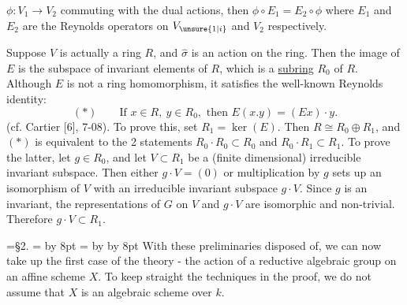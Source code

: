 
$\phi:V_1\longrightarrow V_2$ commuting with the dual actions, then $\phi\circ E_1=E_2\circ\phi$ where $E_1$ and $E_2$ are the Reynolds operators on $V_{\unsure{1|i}}$ and $V_2$ respectively.

Suppose $V$ is actually a ring $R$, and $\hat\sigma$ is an action on the ring. Then the image of $E$ is the subspace of invariant elements of $R$, which is a \uline{subring} $R_0$ of $R$. Although $E$ is not a ring homomorphism, it satisfies the well-known Reynolds identity:
\[
(*)\qquad\text{If }x\in R,\ y\in R_0,\text{ then }E(x.y)=(Ex)\cdot y.
\]
(cf. Cartier\unsure{,} [6], 7-08). To prove this, set $R_1=\ker(E)$. Then $R\cong R_0\oplus R_1$, and $(*)$ is equivalent to the 2 statements $R_0\cdot R_0\subset R_0$ and $R_0\cdot R_1\subset R_1$. To prove the latter, let $g\in R_0$, and let $V\subset R_1$ be a (finite dimensional) irreducible invariant subspace. Then either $g\cdot V=(0)$ or multiplication by $g$ sets up an isomorphism of $V$ with an irreducible invariant subspace $g\cdot V$. Since $g$ is an invariant, the representations of $G$ on $V$ and $g\cdot V$ are isomorphic and non-trivial. Therefore $g\cdot V\subset R_1$.

\begingroup
{}=\hbox{\S2.}
= \advance{} by 8pt
= \advance{} by  \advance{} by 8pt
\leavevmode{}%
\kern4pt\kern4pt\endgroup With these preliminaries disposed of, we can now take up the first case of the theory - the action of a reductive algebraic group on an affine scheme $X$. To keep straight the techniques in the proof, we do not assume that $X$ is an algebraic scheme over $k$.


